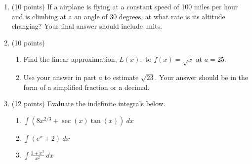 \documentclass[12pt]{article}
\begin{document}
\newpage
\begin{enumerate}
\item (10 points) If a airplane is flying at a constant speed of 100 miles per hour and is climbing at a an angle of 30 degrees, at what rate is its altitude changing? Your final answer should include units.\\

\newpage

\item (10 points)
\begin{enumerate}
\item Find the linear approximation, $L(x),$ to $f(x)=\sqrt{x}$ at $a=25.$
\vspace{1.5in}
\item Use your answer in part $a$ to estimate $\sqrt{23}.$ Your answer should be in the form of a simplified fraction or a decimal.
\vspace{1.5in}
\end{enumerate}

\item (12 points) Evaluate the indefinite integrals below. 
	\begin{enumerate}
	\item $\displaystyle \int \left( 8x^{2/3} +\sec(x)\tan(x) \right) \: dx$
	\vfill
	\item $\displaystyle \int \left( e^x +2 \right) \: dx$
	\vfill
	\item $\displaystyle \int \frac{1+x^3}{x^2} \: dx$
	\vfill
	\end{enumerate}


\end{enumerate}
\end{document}
